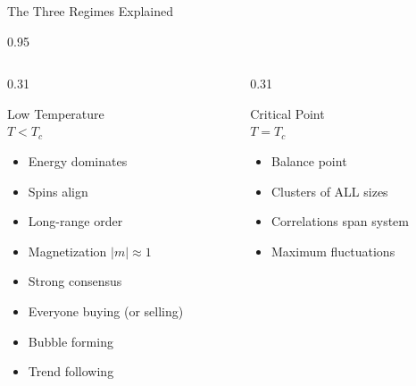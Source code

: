 \documentclass[9pt, aspectratio=169, t]{beamer}
\begin{document}
\begin{frame}{The Three Regimes Explained}
    \begin{cminipage}{0.95\textwidth}
    {\footnotesize
    \begin{columns}[T]
        \begin{column}{0.31\textwidth}
            \begin{exampleblock}{Low Temperature\\$T < T_c$}
                \begin{itemize}\setlength{\itemsep}{0pt}
                    \item Energy dominates
                    \item Spins align
                    \item Long-range order
                    \item Magnetization $|m| \approx 1$
                \end{itemize}

                \begin{itemize}\setlength{\itemsep}{0pt}
                    \item Strong consensus
                    \item Everyone buying (or selling)
                    \item Bubble forming
                    \item Trend following
                \end{itemize}
            \end{exampleblock}
        \end{column}
        \begin{column}{0.31\textwidth}
            \begin{alertblock}{Critical Point\\$T = T_c$}
                \begin{itemize}\setlength{\itemsep}{0pt}
                    \item Balance point
                    \item Clusters of ALL sizes
                    \item Correlations span system
                    \item Maximum fluctuations
                \end{itemize}


\end{alertblock}
\end{column}
\end{columns}}
\end{cminipage}
\end{frame}
\end{document}
